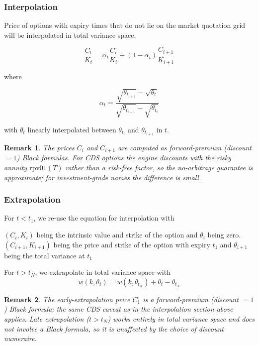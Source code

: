 \documentclass{amsart}
\theoremstyle{plain}
\newtheorem{remark}{Remark}
\numberwithin{equation}{section}
\begin{document}
\subsubsection{Interpolation}

Price of options with expiry times that do not lie on the market quotation grid will be interpolated in total variance space,

\begin{equation}
\frac{C_t}{K_t} = \alpha_t \frac{C_i}{K_i} + (1 - \alpha_t) \frac{C_{i+1}}{K_{i+1}}
\end{equation}

where

\begin{equation}
\alpha_t = \frac{\sqrt{\theta_{t_{i+1}}} - \sqrt{\theta_t}}{\sqrt{\theta_{t_{i+1}}} - \sqrt{\theta_{t_i}}}
\end{equation}

with $\theta_t$ linearly interpolated between $\theta_{t_i}$ and $\theta_{t_{i+1}}$ in $t$.

\begin{remark}
The prices $C_i$ and $C_{i+1}$ are computed as forward-premium (discount $= 1$) Black
formulas.  For CDS options the engine discounts with the risky annuity $\text{rpv01}(T)$
rather than a risk-free factor, so the no-arbitrage guarantee is approximate; for
investment-grade names the difference is small.
\end{remark}

\subsubsection{Extrapolation}
For $t < t_1$, we re-use the equation for interpolation with

$(C_i,K_i)$ being the intrinsic value and strike of the option and $\theta_i$ being zero.
$(C_{i+1},K_{i+1})$ being the price and strike of the option with expiry $t_1$ and $\theta_{i+1}$ being the total variance at $t_1$

For $t > t_N$, we extrapolate in total variance space with
\begin{equation}
w(k,\theta_t) = w(k,\theta_{t_N}) + \theta_t - \theta_{t_N}
\end{equation}

\begin{remark}
The early-extrapolation price $C_1$ is a forward-premium (discount $= 1$) Black formula;
the same CDS caveat as in the interpolation section above applies.
Late extrapolation ($t > t_N$) works entirely in total variance space and does not involve
a Black formula, so it is unaffected by the choice of discount numeraire.
\end{remark}
\end{document}
